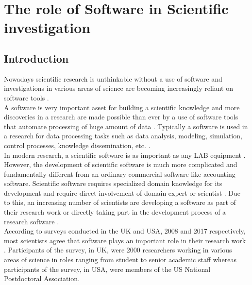 \chapter{The role of Software in Scientific investigation}
\label{ch:Roles}

%

\section{Introduction}
\label{sec:background:intro}

Nowadays scientific research is unthinkable without a use of software and investigations in various areas of science are becoming increasingly reliant on software tools \citep{goble2014better, storer2017bridging, hannay2009scientists, jimenez2017four}. \\

A software is very important asset for building a scientific knowledge and more discoveries in a research are made possible than ever by a use of software tools that automate processing of huge amount of data \citep{jimenez2017four}. Typically a software is used in a research for data processing tasks such as data analysis, modeling, simulation, control processes, knowledge dissemination, etc. \citep{hannay2009scientists, pan2016disciplinary}. \\

In modern research, a scientific software is as important as any LAB equipment \citep{wilson2014best}. However, the development of scientific software is much more complicated and fundamentally different from an ordinary commercial software like accounting software. Scientific software requires specialized domain knowledge for its development and require direct involvement of domain expert or scientist \citep{wilson2014best, segal2008developing}. Due to this, an increasing number of scientists are developing a software as part of their research work or directly taking part in the development process of a research software \citep{jimenez2017four, kanewala2014testing}. \\

According to surveys conducted in the UK and USA, 2008 and 2017 respectively, most scientists agree that software plays an important role in their research work \citep{hettrick2014uk, nangia2017track}. Participants of the survey, in UK, were 2000 researchers working in various areas of science in roles ranging from student to senior academic staff whereas participants of the survey, in USA, were members of the US National Postdoctoral Association. \\
 
